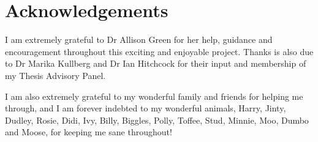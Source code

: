 
\chapter*{Acknowledgements}

I am extremely grateful to Dr Allison Green for her help, guidance and encouragement throughout this exciting and enjoyable project.
Thanks is also due to Dr Marika Kullberg and Dr Ian Hitchcock for their input and membership of my Thesis Advisory Panel.

I am also extremely grateful to my wonderful family and friends for helping me through, and I am forever indebted to my wonderful animals, Harry, Jinty, Dudley, Rosie, Didi, Ivy, Billy, Biggles, Polly, Toffee, Stud, Minnie, Moo, Dumbo and Moose, for keeping me sane throughout!





